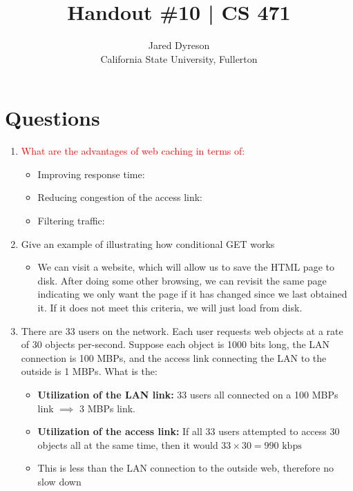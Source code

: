 \documentclass{article}
\title{Handout \#10 | CS 471}
\author{Jared Dyreson\\ 
        California State University, Fullerton}
\begin{document}
\maketitle
\tableofcontents

\newpage

\section{Questions}

\begin{enumerate}
\item \textcolor{red}{What are the advantages of web caching in terms of:}

\begin{itemize}
\item Improving response time:
\item Reducing congestion of the access link:
\item Filtering traffic:
\end{itemize}

\item Give an example of illustrating how conditional GET works

\begin{itemize}
\item We can visit a website, which will allow us to save the HTML page to disk. After doing some other browsing, we can revisit the same page indicating we only want the page if it has changed since we last obtained it. If it does not meet this criteria, we will just load from disk.
\end{itemize}

\item There are 33 users on the network. Each user requests web objects at a rate of 30 objects per-second. Suppose each object is 1000 bits long, the LAN connection is 100 MBPs, and the access link connecting the LAN to the outside is 1 MBPs. What is the:

\begin{itemize}
\item \textbf{Utilization of the LAN link:} 33 users all connected on a 100 MBPs link $\implies$ 3 MBPs link.
\item \textbf{Utilization of the access link:} If all 33 users attempted to access 30 objects all at the same time, then it would $33 \times 30 = 990 \text{ kbps }$
\item This is less than the LAN connection to the outside web, therefore no slow down
\end{itemize}


\end{enumerate}
\end{document}
